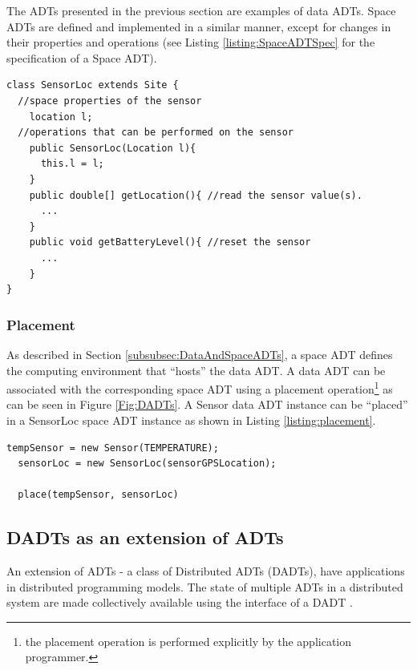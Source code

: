 The ADTs presented in the previous section are examples of data ADTs. Space
ADTs are defined and implemented in a similar manner, except for changes in
their properties and operations (see Listing \ref{listing:SpaceADTSpec} for the
specification of a Space ADT).  
 
 \begin{lstlisting}[frame=trbl, basewidth={0.55em, 0.6em}, captionpos=b, basicstyle=\ttfamily\footnotesize, breaklines, caption = Sensor Space ADT specification (reproduced from \cite{migliavacca_DADT:2006}), label = listing:SpaceADTSpec ]
class SensorLoc extends Site {
  //space properties of the sensor 
	location l;
  //operations that can be performed on the sensor
	public SensorLoc(Location l){
	  this.l = l;
	}
	public double[] getLocation(){ //read the sensor value(s).
	  ...
	}
	public void getBatteryLevel(){ //reset the sensor
	  ...
	}
}
\end{lstlisting}
 
\subsubsection{Placement}
 
As described in Section \ref{subsubsec:DataAndSpaceADTs}, a space ADT defines
the computing environment that ``hosts'' the data ADT. A data ADT can be
associated with the corresponding space ADT using a placement operation\footnote{the placement operation is
performed explicitly by the application programmer.} as can be seen in Figure \ref{Fig:DADTs}.
A Sensor data ADT
instance can be ``placed'' in a SensorLoc space ADT instance as shown in Listing
\ref{listing:placement}. 

\begin{lstlisting}[frame=trbl, basewidth={0.55em, 0.6em}, captionpos=b, basicstyle=\ttfamily\footnotesize, breaklines, caption = ADT placement, label = listing:placement ]
  tempSensor = new Sensor(TEMPERATURE);
  sensorLoc = new SensorLoc(sensorGPSLocation);
  
  place(tempSensor, sensorLoc)
\end{lstlisting}

\subsection{DADTs as an extension of ADTs}
An extension of ADTs - a class of Distributed ADTs (DADTs), have applications 
in distributed programming models. The state of multiple ADTs in a distributed
system are made collectively available using the interface of a DADT
\cite{migliavacca_DADT:2006}. 

